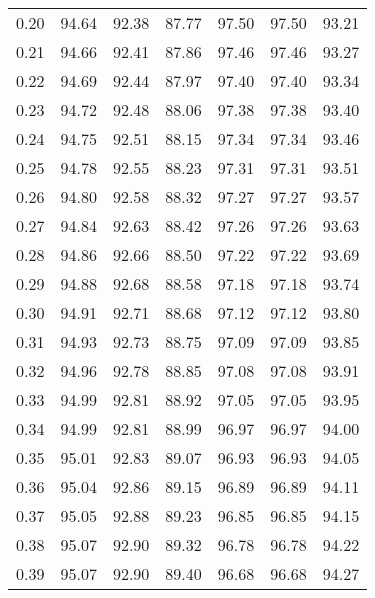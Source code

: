 \begin{tabular}{|c|c|c|c|c|c|c|}
      0.20 &     94.64 &     92.38 &      87.77 &   97.50 &      97.50 &         93.21 \\
      0.21 &     94.66 &     92.41 &      87.86 &   97.46 &      97.46 &         93.27 \\
      0.22 &     94.69 &     92.44 &      87.97 &   97.40 &      97.40 &         93.34 \\
      0.23 &     94.72 &     92.48 &      88.06 &   97.38 &      97.38 &         93.40 \\
      0.24 &     94.75 &     92.51 &      88.15 &   97.34 &      97.34 &         93.46 \\
      0.25 &     94.78 &     92.55 &      88.23 &   97.31 &      97.31 &         93.51 \\
      0.26 &     94.80 &     92.58 &      88.32 &   97.27 &      97.27 &         93.57 \\
      0.27 &     94.84 &     92.63 &      88.42 &   97.26 &      97.26 &         93.63 \\
      0.28 &     94.86 &     92.66 &      88.50 &   97.22 &      97.22 &         93.69 \\
      0.29 &     94.88 &     92.68 &      88.58 &   97.18 &      97.18 &         93.74 \\
      0.30 &     94.91 &     92.71 &      88.68 &   97.12 &      97.12 &         93.80 \\
      0.31 &     94.93 &     92.73 &      88.75 &   97.09 &      97.09 &         93.85 \\
      0.32 &     94.96 &     92.78 &      88.85 &   97.08 &      97.08 &         93.91 \\
      0.33 &     94.99 &     92.81 &      88.92 &   97.05 &      97.05 &         93.95 \\
      0.34 &     94.99 &     92.81 &      88.99 &   96.97 &      96.97 &         94.00 \\
      0.35 &     95.01 &     92.83 &      89.07 &   96.93 &      96.93 &         94.05 \\
      0.36 &     95.04 &     92.86 &      89.15 &   96.89 &      96.89 &         94.11 \\
      0.37 &     95.05 &     92.88 &      89.23 &   96.85 &      96.85 &         94.15 \\
      0.38 &     95.07 &     92.90 &      89.32 &   96.78 &      96.78 &         94.22 \\
      0.39 &     95.07 &     92.90 &      89.40 &   96.68 &      96.68 &         94.27 \\

\end{tabular}
